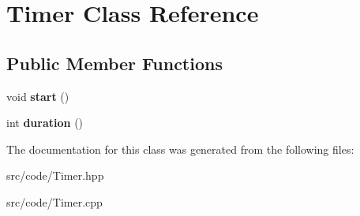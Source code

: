 \hypertarget{class_timer}{}\section{Timer Class Reference}
\label{class_timer}
\subsection*{Public Member Functions}
\begin{DoxyCompactItemize}
\item 
\mbox{\label{class_timer_a3a8b5272198d029779dc9302a54305a8}} 
void {\bfseries start} ()
\item 
\mbox{\label{class_timer_a8fc4d7e945ec22dda323afe014fc96b7}} 
int {\bfseries duration} ()
\end{DoxyCompactItemize}


The documentation for this class was generated from the following files\+:\begin{DoxyCompactItemize}
\item 
src/code/Timer.\+hpp\item 
src/code/Timer.\+cpp\end{DoxyCompactItemize}
